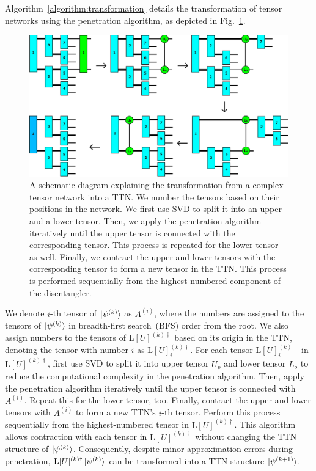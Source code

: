 \documentclass[12pt,dvipdfmx,twoside,openright]{report}
\begin{document}
Algorithm~\ref{algorithm:transformation} details the transformation of tensor networks using the penetration algorithm, as depicted in Fig.~\ref{fig:decomposition-c}.
\begin{figure}
    \centering
    \includegraphics[width=\linewidth]{fig-decomposition-c.pdf}
    \caption{A schematic diagram explaining the transformation from a complex tensor network into a TTN. We number the tensors based on their positions in the network. We first use SVD to split it into an upper and a lower tensor. Then, we apply the penetration algorithm iteratively until the upper tensor is connected with the corresponding tensor. This process is repeated for the lower tensor as well. Finally, we contract the upper and lower tensors with the corresponding tensor to form a new tensor in the TTN. This process is performed sequentially from the highest-numbered component of the disentangler.
    }
    \label{fig:decomposition-c}
\end{figure}
We denote $i$-th tensor of $\ket{\psi^{(k)}}$ as $A^{(i)}$, where the numbers are assigned to the tensors of $\ket{\psi^{(k)}}$ in breadth-first search~(BFS) order from the root.
We also assign numbers to the tensors of $\mathrm{L}[U]^{(k)\dagger}$ based on its origin in the TTN, denoting the tensor with number $i$ as $\mathrm{L}[U]^{(k)\dagger}_i$.
For each tensor $\mathrm{L}[U]^{(k)\dagger}_i$ in $\mathrm{L}[U]^{(k)\dagger}$, first use SVD to split it into upper tensor $U_p$ and lower tensor $L_o$ to reduce the computational complexity in the penetration algorithm.
Then, apply the penetration algorithm iteratively until the upper tensor is connected with $A^{(i)}$.
Repeat this for the lower tensor, too.
Finally, contract the upper and lower tensors with $A^{(i)}$ to form a new TTN's $i$-th tensor.
Perform this process sequentially from the highest-numbered tensor in $\mathrm{L}[U]^{(k)\dagger}$.
This algorithm allows contraction with each tensor in $\mathrm{L}[U]^{(k)\dagger}$ without changing the TTN structure of $\ket{\psi^{(k)}}$.
Consequently, despite minor approximation errors during penetration, $\mathrm{L}[U]^{(k)\dagger}\ket{\psi^{(k)}}$ can be transformed into a TTN structure $\ket{\psi^{(k+1)}}$.
\end{document}

